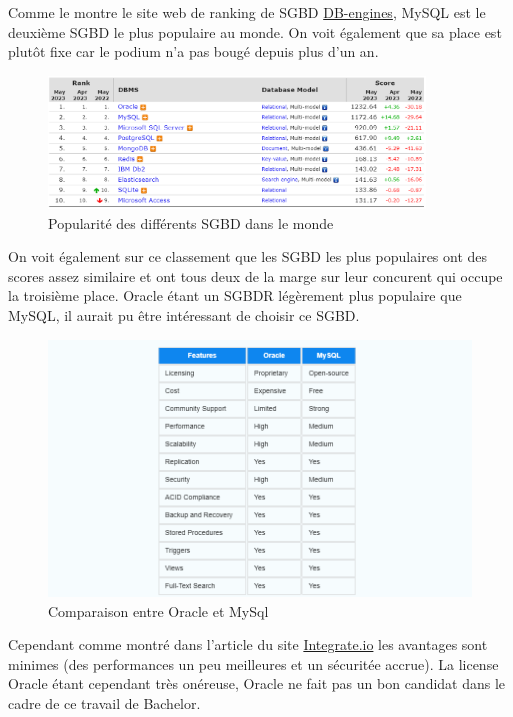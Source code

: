 Comme le montre le site web de ranking de SGBD \href{https://db-engines.com/en/ranking}{DB-engines}, MySQL est le deuxième SGBD le plus populaire au monde. On voit également que sa place est plutôt fixe car le podium n'a pas bougé depuis plus d'un an.
\begin{center} %
    \begin{figure}[H]
        \includegraphics[width=10cm]{./assets/figures/MySQLPopularity.png}
        \caption{Popularité des différents SGBD dans le monde \label{MySQLPopularity.png}}
    \end{figure}
\end{center}
On voit également sur ce classement que les SGBD les plus populaires ont des scores assez similaire et ont tous deux de la marge sur leur concurent qui occupe la troisième place. Oracle étant un SGBDR légèrement plus populaire que MySQL, il aurait pu être intéressant de choisir ce SGBD.

\begin{center}
    \begin{figure}[H]%
        \includegraphics[width=\textwidth]{./assets/figures/OracleVsMySql.png}
        \caption{Comparaison entre Oracle et MySql \label{OracleVsMySql.png}}
    \end{figure}
\end{center}
Cependant comme montré dans l'article du site \href{https://www.integrate.io/blog/oracle-vs-mysql/#:~:text=Oracle%20supports%20distributed%20databases%20while,Oracle%20requires%20a%20licensing%20fee.}{Integrate.io} les avantages sont minimes (des performances un peu meilleures et un sécuritée accrue). La license Oracle étant cependant très onéreuse, Oracle ne fait pas un bon candidat dans le cadre de ce travail de Bachelor.

